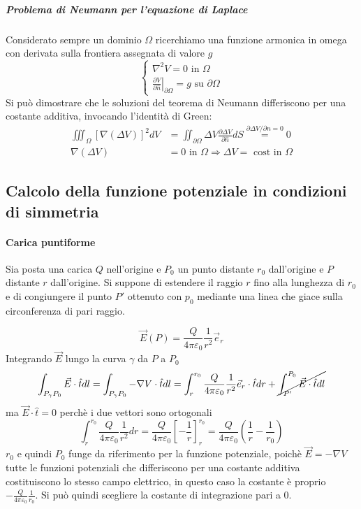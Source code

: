\subparagraph{Problema di Neumann per l'equazione di Laplace}
Considerato sempre un dominio $\Omega$ ricerchiamo una funzione armonica in omega con derivata 
sulla frontiera assegnata di valore $g$
$$
\begin{cases}
\nabla^2 V = 0 \text{ in } \Omega\\
\left.\frac{\partial V}{\partial\hat{n}}\right|_{\partial \Omega} = g \text{ su } \partial \Omega
\end{cases}
$$
Si può dimostrare che le soluzioni del teorema di Neumann differiscono per una
costante additiva, invocando l'identità di Green:
$$
\begin{aligned}
\iiint_{\Omega} \left[\nabla(\Delta V)\right]^2 dV &= \iint_{\partial\Omega} \Delta V \frac{\partial\Delta V}{\partial \hat{n}} dS \stackrel{\partial\Delta V/\partial n = 0 }{=} 0\\
\nabla(\Delta V) &= 0 \text{ in } \Omega \Rightarrow \Delta V = \text{ cost in }\Omega 
\end{aligned}
$$

\subsection{Calcolo della funzione potenziale in condizioni di simmetria}
\paragraph{Carica puntiforme}
Sia posta una carica $Q$ nell'origine e $P_0$ un punto distante $r_0$ dall'origine e $P$ distante $r$ dall'origine.
Si suppone di estendere il raggio $r$ fino alla lunghezza di $r_0$ e di congiungere il punto $P'$
ottenuto con $p_0$ mediante una linea che giace sulla circonferenza di pari raggio.

$$
\vec{E}(P) = \frac{Q}{4\pi \varepsilon_0}\frac{1}{r^2} \vec{e}_r
$$
Integrando $\vec{E}$ lungo la curva $\gamma$ da $P$ a $P_0$
$$
\int_{P_\gamma P_0} \vec{E}\cdot \hat{t} dl = \int_{P_\gamma P_0} -\nabla V\cdot \hat{t} dl = 
\int_r^{r_0} \frac{Q}{4\pi\varepsilon_0}\frac{1}{r^2} \vec{e}_r\cdot \hat{t} dr + 
\cancel{\int_{P'}^{P_0} \vec{E}\cdot\hat{t} dl}
$$
ma $\vec{E}\cdot\hat{t} = 0$ perchè i due vettori sono ortogonali
$$
\int_r^{r_0} \frac{Q}{4\pi\varepsilon_0}\frac{1}{r^2}dr = \frac{Q}{4\pi\varepsilon_0}\left[-\frac{1}{r}\right]_r^{r_0} = \frac{Q}{4\pi\varepsilon_0}\left(\frac{1}{r} - \frac{1}{r_0}\right)
$$
$r_0$ e quindi $P_0$ funge da riferimento per la funzione potenziale, poichè $\vec{E} = -\nabla V$ 
tutte le funzioni potenziali che differiscono per una costante additiva costituiscono lo stesso
campo elettrico, in questo caso la costante è proprio $-\frac{Q}{4\pi\varepsilon_0}\frac{1}{r_0}$.
Si può quindi scegliere la costante di integrazione pari a $0$.

